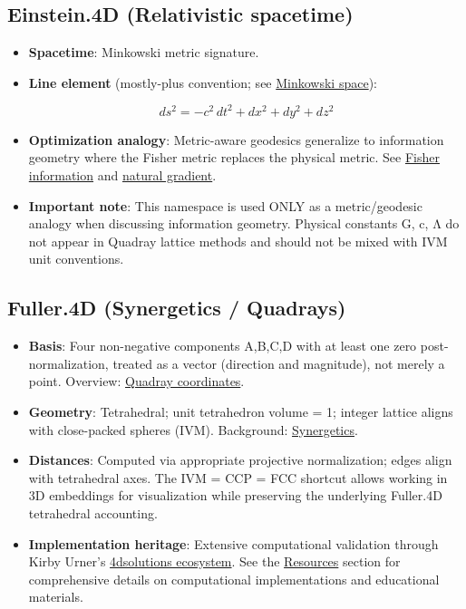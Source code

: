 \documentclass[
  10pt,
]{article}
\providecommand{\tightlist}{%
  \setlength{\itemsep}{0pt}\setlength{\parskip}{0pt}}
\begin{document}
\hypertarget{einstein.4d-relativistic-spacetime}{%
\subsection{Einstein.4D (Relativistic
spacetime)}\label{einstein.4d-relativistic-spacetime}}

\begin{itemize}
\item
  \textbf{Spacetime}: Minkowski metric signature.
\item
  \textbf{Line element} (mostly-plus convention; see
  \href{https://en.wikipedia.org/wiki/Minkowski_space}{Minkowski
  space}):

  \begin{equation}\label{eq:einstein_line_element}
  ds^2 = -c^2\,dt^2 + dx^2 + dy^2 + dz^2
  \end{equation}
\item
  \textbf{Optimization analogy}: Metric-aware geodesics generalize to
  information geometry where the Fisher metric replaces the physical
  metric. See
  \href{https://en.wikipedia.org/wiki/Fisher_information}{Fisher
  information} and
  \href{https://en.wikipedia.org/wiki/Natural_gradient}{natural
  gradient}.
\item
  \textbf{Important note}: This namespace is used ONLY as a
  metric/geodesic analogy when discussing information geometry. Physical
  constants G, c, Λ do not appear in Quadray lattice methods and should
  not be mixed with IVM unit conventions.
\end{itemize}

\hypertarget{fuller.4d-synergetics-quadrays}{%
\subsection{Fuller.4D (Synergetics /
Quadrays)}\label{fuller.4d-synergetics-quadrays}}

\begin{itemize}
\tightlist
\item
  \textbf{Basis}: Four non-negative components A,B,C,D with at least one
  zero post-normalization, treated as a vector (direction and
  magnitude), not merely a point. Overview:
  \href{https://en.wikipedia.org/wiki/Quadray_coordinates}{Quadray
  coordinates}.
\item
  \textbf{Geometry}: Tetrahedral; unit tetrahedron volume = 1; integer
  lattice aligns with close-packed spheres (IVM). Background:
  \href{https://en.wikipedia.org/wiki/Synergetics_(Fuller)}{Synergetics}.
\item
  \textbf{Distances}: Computed via appropriate projective normalization;
  edges align with tetrahedral axes. The IVM = CCP = FCC shortcut allows
  working in 3D embeddings for visualization while preserving the
  underlying Fuller.4D tetrahedral accounting.
\item
  \textbf{Implementation heritage}: Extensive computational validation
  through Kirby Urner's
  \href{https://github.com/4dsolutions}{4dsolutions ecosystem}. See the
  \href{07_resources.md}{Resources} section for comprehensive details on
  computational implementations and educational materials.
\end{itemize}
\end{document}
